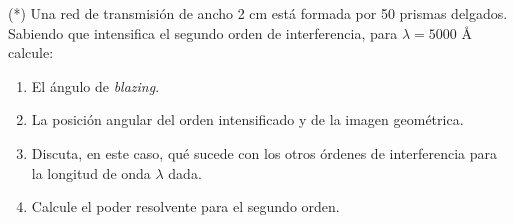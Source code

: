\item (*) Una red de transmisión de ancho 2 cm está formada por 50 prismas delgados.
Sabiendo que intensifica el segundo orden de interferencia, para $\lambda=5000$ Å calcule: 
\begin{enumerate}
	\item El ángulo de \emph{blazing}. 
	\item La posición angular del orden intensificado y de la imagen geométrica. 
	\item Discuta, en este caso, qué sucede con los otros órdenes de interferencia para la longitud de onda $\lambda$ dada.
	\item Calcule el poder resolvente para el segundo orden. 
\end{enumerate}
